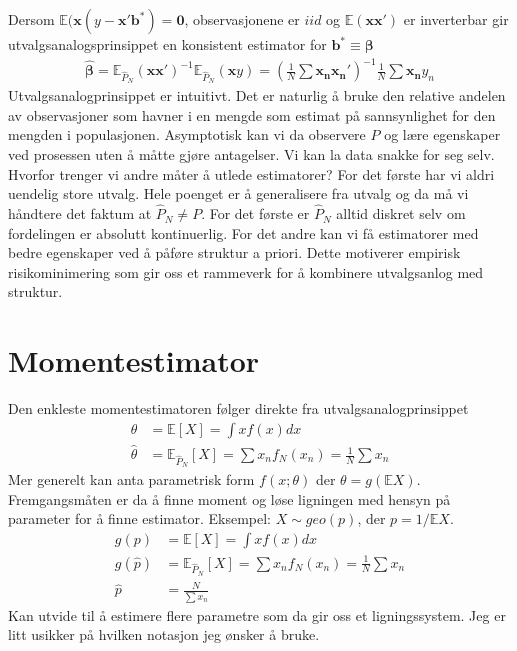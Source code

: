 Dersom $\mathbb{E}(\mathbf{x}(y-\mathbf{x}'\mathbf{b}^*) = \mathbf{0}$, observasjonene er $iid$ og $\mathbb{E}(\mathbf{x}\mathbf{x}')$ er inverterbar gir utvalgsanalogsprinsippet en konsistent estimator for $\mathbf{b}^* \equiv \mathbf{\beta}$
\begin{align}
\widehat{\mathbf{\beta}} = \mathbb{E}_{\hat{P}_N}( \mathbf{x}\mathbf{x}')^{-1}\mathbb{E}_{\hat{P}_N}(\mathbf{x}y) =  \left(\frac{1}{N}\sum \mathbf{x_n x_n'} \right)^{-1}\frac{1}{N}\sum \mathbf{x_n}y_n
\end{align}
Utvalgsanalogprinsippet er intuitivt. Det er naturlig å bruke den relative andelen av observasjoner som havner i en mengde som estimat på sannsynlighet for den mengden i populasjonen. Asymptotisk kan vi da observere $P$ og lære egenskaper ved prosessen uten å måtte gjøre antagelser. Vi kan la data snakke for seg selv. Hvorfor trenger vi andre måter å utlede estimatorer? For det første har vi aldri uendelig store utvalg. Hele poenget er å generalisere fra utvalg og da må vi håndtere det faktum at $\hat{P}_N \neq P$. For det første er $\hat{P}_N$ alltid diskret selv om fordelingen er absolutt kontinuerlig. For det andre kan vi få estimatorer med bedre egenskaper ved å påføre struktur a priori. Dette motiverer empirisk risikominimering som gir oss et rammeverk for å kombinere utvalgsanlog med struktur.
\section{Momentestimator}
Den enkleste momentestimatoren følger direkte fra utvalgsanalogprinsippet
\begin{align}
\theta &= \mathbb{E}[X] = \int xf(x)dx \\
\hat{\theta} &= \mathbb{E}_{\hat{P}_N}[X] = \sum x_n f_N(x_n) = \frac{1}{N}\sum x_n
\end{align}
Mer generelt kan anta parametrisk form $f(x;\theta)$ der $\theta = g(\mathbb{E}X)$. Fremgangsmåten er da å finne moment og løse ligningen med hensyn på parameter for å finne estimator. Eksempel: $X \sim geo(p)$, der $p=1/\mathbb{E}X$.
\begin{align}
g(p) &= \mathbb{E}[X] = \int xf(x)dx \\
g(\hat{p}) &= \mathbb{E}_{\hat{P}_N}[X] = \sum x_n f_N(x_n) = \frac{1}{N}\sum x_n \\
\hat{p} &= \frac{N}{\sum x_n}
\end{align}
Kan utvide til å estimere flere parametre som da gir oss et ligningssystem. Jeg er litt usikker på hvilken notasjon jeg ønsker å bruke.
